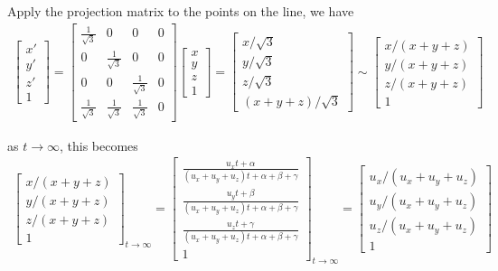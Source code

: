 \documentclass[11pt]{article}  %
\begin{document}
    Apply the projection matrix to the points on the line, we have
    \begin{align*}
        \begin{bmatrix}
            x'\\y'\\z'\\1
        \end{bmatrix}
        =
        \begin{bmatrix}
            \frac{1}{\sqrt{3}} & 0 & 0 & 0\\
            0 & \frac{1}{\sqrt{3}} & 0 & 0\\
            0 & 0 & \frac{1}{\sqrt{3}} & 0\\
            \frac{1}{\sqrt{3}} & \frac{1}{\sqrt{3}} & \frac{1}{\sqrt{3}} & 0
        \end{bmatrix}
        \begin{bmatrix}
            x\\y\\z\\1
        \end{bmatrix}
        =
        \begin{bmatrix}
            x/\sqrt{3}\\y/\sqrt{3}\\z/\sqrt{3}\\(x+y+z)/\sqrt{3}
        \end{bmatrix}
        \sim
        \begin{bmatrix}
            x/(x+y+z)\\y/(x+y+z)\\z/(x+y+z)\\1
        \end{bmatrix}
    \end{align*}
    
    as ${t\to\infty}$, this becomes
    \begin{align*}
        \begin{bmatrix}
            x/(x+y+z)\\y/(x+y+z)\\z/(x+y+z)\\1
        \end{bmatrix}_{t\to\infty}
        =
        \begin{bmatrix}
            \frac{u_xt+\alpha}{(u_x+u_y+u_z)t+\alpha+\beta+\gamma}\\
            \frac{u_yt+\beta}{(u_x+u_y+u_z)t+\alpha+\beta+\gamma}\\
            \frac{u_zt+\gamma}{(u_x+u_y+u_z)t+\alpha+\beta+\gamma}\\
            1
        \end{bmatrix}_{t\to\infty}
        =
        \begin{bmatrix}
            u_x/(u_x+u_y+u_z)\\u_y/(u_x+u_y+u_z)\\u_z/(u_x+u_y+u_z)\\1
        \end{bmatrix}
    \end{align*}
    
\end{document}
